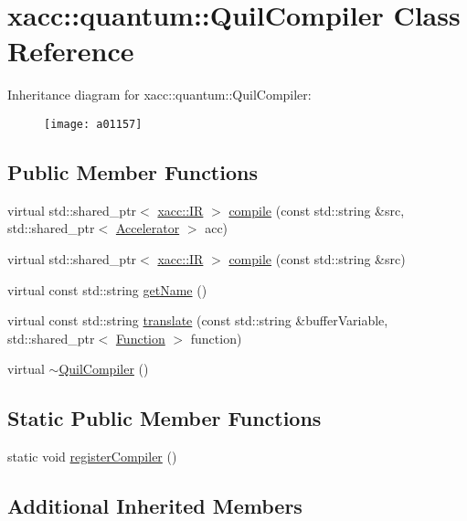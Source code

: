 \hypertarget{a01157}{}\section{xacc\+:\+:quantum\+:\+:Quil\+Compiler Class Reference}
\label{a01157}
Inheritance diagram for xacc\+:\+:quantum\+:\+:Quil\+Compiler\+:\begin{figure}[H]
\begin{center}
\leavevmode
\texttt{[image: a01157]}
\end{center}
\end{figure}
\subsection*{Public Member Functions}
\begin{DoxyCompactItemize}
\item 
virtual std\+::shared\+\_\+ptr$<$ \hyperlink{a01677}{xacc\+::\+IR} $>$ \hyperlink{a01157_a2421482415ca4e09963ea4ecddff8100}{compile} (const std\+::string \&src, std\+::shared\+\_\+ptr$<$ \hyperlink{a01613}{Accelerator} $>$ acc)
\item 
virtual std\+::shared\+\_\+ptr$<$ \hyperlink{a01677}{xacc\+::\+IR} $>$ \hyperlink{a01157_adf4d321ecb0df3fa7728999f941c83b2}{compile} (const std\+::string \&src)
\item 
virtual const std\+::string \hyperlink{a01157_ae7d52140b6dd52730edc6e38ae48f437}{get\+Name} ()
\item 
virtual const std\+::string \hyperlink{a01157_a66ca00bbb1f30e7bc6dd86b1e267b93b}{translate} (const std\+::string \&buffer\+Variable, std\+::shared\+\_\+ptr$<$ \hyperlink{a01653}{Function} $>$ function)
\item 
virtual \hyperlink{a01157_a0866a9f695f28c90ac1f4754374f3bfe}{$\sim$\+Quil\+Compiler} ()
\end{DoxyCompactItemize}
\subsection*{Static Public Member Functions}
\begin{DoxyCompactItemize}
\item 
static void \hyperlink{a01157_aaec99a14bede717bf02a0f65af2a3c69}{register\+Compiler} ()
\end{DoxyCompactItemize}
\subsection*{Additional Inherited Members}


